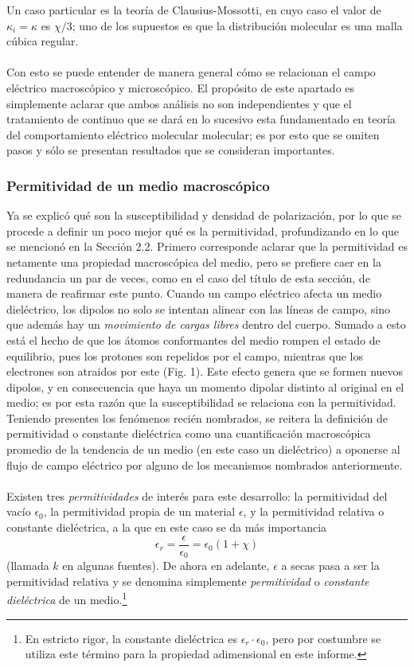 \documentclass[12pt, notitlepage]{article}
\begin{document}
Un caso particular es la teoría de Clausius-Mossotti, en cuyo caso el valor de $\kappa_i = \kappa$ es $\chi/3$; uno de los supuestos es que la distribución molecular es una malla cúbica regular.\\\\
Con esto se puede entender de manera general cómo se relacionan el campo eléctrico macroscópico y microscópico. El propósito de este apartado es simplemente aclarar que ambos análisis no son independientes y que el tratamiento de continuo que se dará en lo sucesivo esta fundamentado en teoría del comportamiento eléctrico molecular molecular; es por esto que se omiten pasos y sólo se presentan resultados que se consideran importantes.

\subsubsection{Permitividad de un medio macroscópico}
Ya se explicó qué son la susceptibilidad y densidad de polarización, por lo que se procede a definir un poco mejor qué es la permitividad, profundizando en lo que se mencionó en la Sección 2.2.
Primero corresponde aclarar que la permitividad es netamente una propiedad macroscópica del medio, pero se prefiere caer en la redundancia un par de veces, como en el caso del título de esta sección, de manera de reafirmar este punto. Cuando un campo eléctrico afecta un medio dieléctrico, los dipolos no solo se intentan alinear con las líneas de campo, sino que además hay un \textit{movimiento de cargas libres} dentro del cuerpo. Sumado a esto está el hecho de que los átomos conformantes del medio rompen el estado de equilibrio, pues los protones son repelidos por el campo, mientras que los electrones son atraidos por este (Fig. 1). Este efecto genera que se formen nuevos dipolos, y en consecuencia que haya un momento dipolar distinto al original en el medio; es por esta razón que la susceptibilidad se relaciona con la permitividad. Teniendo presentes los fenómenos recién nombrados, se reitera la definición de permitividad o constante dieléctrica como una cuantificación macroscópica promedio de la tendencia de un medio (en este caso un dieléctrico) a oponerse al flujo de campo eléctrico por alguno de los mecanismos nombrados anteriormente.\\\\
Existen tres \textit{permitividades} de interés para este desarrollo: la permitividad del vacío $\epsilon_0$, la permitividad propia de un material $\epsilon$, y la permitividad relativa o constante dieléctrica, a la que en este caso se da más importancia
\begin{equation}
\epsilon_r = \frac{\epsilon}{\epsilon_0}=\epsilon_0(1+\chi)
\end{equation}
(llamada $k$ en algunas fuentes). De ahora en adelante, $\epsilon$ a secas pasa a ser la permitividad relativa y se denomina simplemente \textit{permitividad} o \textit{constante dieléctrica} de un medio.\footnote{En estricto rigor, la constante dieléctrica es $\epsilon_r\cdot\epsilon_0$, pero por costumbre se utiliza este término para la propiedad adimensional en este informe.}
\end{document}
